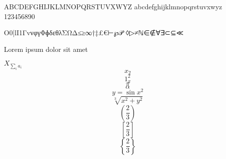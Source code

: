 \documentclass[12pt,a4paper,oneside]{article}
\begin{document}
ABCDEFGHIJKLMNOPQRSTUVXWYZ abcdefghijklmnopqrstuvxwyz 123456890

O0|lI1ΓvνφγΦɸδεθλΣΩΔ≤≥∞†‡£€⊢℘𝒫 ◊▷≠ℕ∈∉∀∃⊂⊆≪

Lorem ipsum dolor sit amet

$X_{\sum_i a_i}$
$$x_2$$
$$1_x^2$$
$$\pi$$
$$\alpha$$
$$y=\sin{x}^2$$
$$\sqrt[3]{x^2+y^2}$$
$$\left(\frac{2}{3}\right)$$
$$\left[\frac{2}{3}\right]$$
$$\left\{\frac{2}{3}\right\}$$
\end{document}
